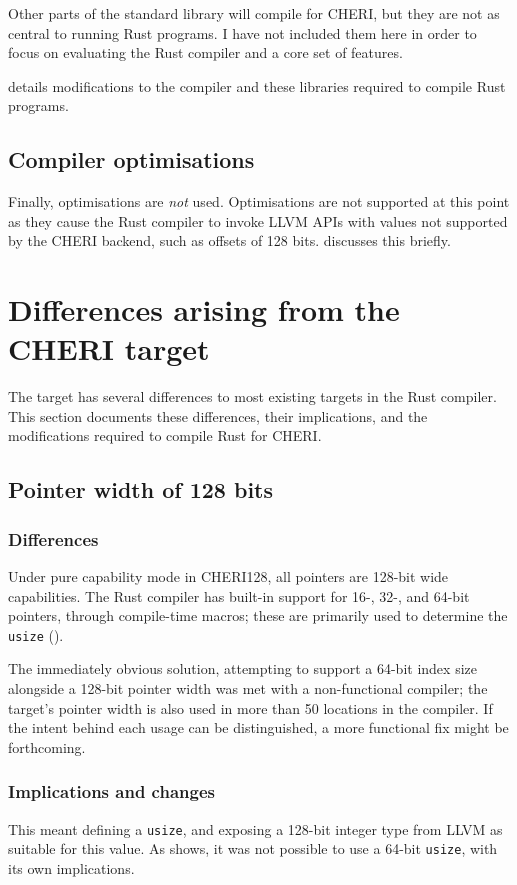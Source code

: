 \documentclass[dissertation.tex]{subfiles}
\begin{document}
Other parts of the standard library will compile for CHERI, but they are
not as central to running Rust programs.
I have not included them here in order to focus on evaluating the Rust
compiler and a core set of features.

 details modifications to the compiler and
these libraries required to compile Rust programs.

\subsection{Compiler optimisations}
Finally, optimisations are \emph{not} used.
Optimisations are not supported at this point as they cause the Rust
compiler to invoke LLVM APIs with values not supported by the CHERI
backend, such as offsets of 128 bits.
 discusses this briefly.


\section{Differences arising from the CHERI target}
\label{sec:impl-divergences}

The \cuf target has several differences to most existing targets in the
Rust compiler.
This section documents these differences, their implications, and the
modifications required to compile Rust for CHERI.


\subsection{Pointer width of 128 bits}
\label{sec:impl-width}

\subsubsection{Differences}
Under pure capability mode in CHERI128, all pointers are 128-bit wide
capabilities.
The Rust compiler has built-in support for 16-, 32-, and 64-bit
pointers, through compile-time macros; these are primarily used to
determine the \texttt{usize} ().

The immediately obvious solution, attempting to support a 64-bit index
size alongside a 128-bit pointer width was met with a non-functional
compiler; the target's pointer width is also used in more than 50
locations in the compiler.
If the intent behind each usage can be distinguished, a more functional
fix might be forthcoming.

\subsubsection{Implications and changes}
This meant defining a \texttt{usize}, and exposing a 128-bit integer
type from LLVM as suitable for this value.
As  shows, it was not possible to use a
64-bit \texttt{usize}, with its own implications.
\end{document}
